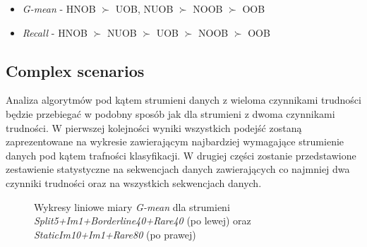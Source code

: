 \begin{itemize}
    \item \textit{G-mean} - HNOB $\succ$ UOB, NUOB $\succ$ NOOB $\succ$ OOB
    \item \textit{Recall} - HNOB $\succ$ NUOB $\succ$ UOB $\succ$ NOOB $\succ$ OOB
\end{itemize}

\subsection{Complex scenarios}
\label{Label:ComplexScenariosHNOB}

\noindent Analiza algorytmów pod kątem strumieni danych z wieloma czynnikami trudności będzie przebiegać w podobny sposób jak dla strumieni z dwoma czynnikami trudności. W pierwszej kolejności wyniki wszystkich podejść zostaną zaprezentowane na wykresie zawierającym najbardziej wymagające strumienie danych pod kątem trafności klasyfikacji. W drugiej części zostanie przedstawione zestawienie statystyczne na sekwencjach danych zawierających co najmniej dwa czynniki trudności oraz na wszystkich sekwencjach danych.

\newpage

\begin{figure}[h]
    \centering
    \qquad
    \caption{Wykresy liniowe miary \textit{G-mean} dla strumieni \textit{Split5+Im1+Borderline40+Rare40} (po lewej) oraz \textit{StaticIm10+Im1+Rare80} (po prawej)}
\end{figure}

